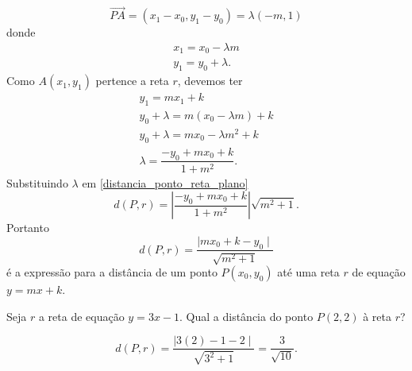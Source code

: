 \[
  \vec{PA} = (x_1 - x_0, y_1 - y_0) = \lambda(-m, 1)
\]
donde
\begin{align*}
  x_1 = x_0 - \lambda m\\
  y_1 = y_0 + \lambda.
\end{align*}
Como $A(x_1, y_1)$ pertence a reta $r$, devemos ter
\begin{align*}
  y_1 = mx_1 + k\\
  y_0 + \lambda = m(x_0 - \lambda m) + k\\
  y_0 + \lambda = mx_0 - \lambda m^2 + k\\
  \lambda = \dfrac{-y_0 + mx_0 + k}{1 + m^2}.
\end{align*}
Substituindo $\lambda$ em \eqref{distancia_ponto_reta_plano}
\[
  d(P, r) = \left|\dfrac{-y_0 + mx_0 + k}{1 + m^2}\right|\sqrt{m^2 + 1}.
\]
Portanto
\[
  d(P, r) = \dfrac{\mid mx_0 + k - y_0\mid}{\sqrt{m^2 + 1}}
\]
\'e a express\~ao para a dist\^ancia de um ponto $P(x_0,y_0)$ at\'e uma reta $r$ de equa\c{c}\~ao $y = mx + k$.

\begin{exemplos}
  Seja $r$ a reta de equa\c{c}\~ao $y = 3x - 1$. Qual a dist\^ancia do ponto $P(2,2)$ \`a reta $r$?
  \begin{solucao}
    \[
      d(P,r) = \dfrac{\mid 3(2) - 1 - 2\mid}{\sqrt{3^2 + 1}} = \dfrac{3}{\sqrt{10}}.
    \]
  \end{solucao}
\end{exemplos}



